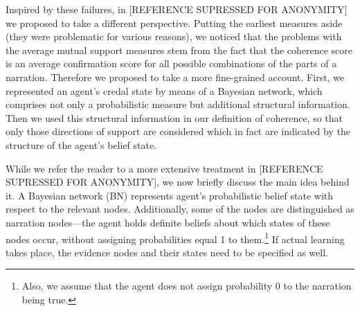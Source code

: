 \documentclass[
  10pt,
]{scrartcl}
\begin{document}
Inspired by these failures, in {[}REFERENCE SUPRESSED FOR ANONYMITY{]} we proposed to take a different perspective. Putting the earliest measures aside (they were problematic for various reasons), we noticed that the problems with the average mutual support measures stem from the fact that the coherence score is an average confirmation score for all possible combinations of the parts of a narration. Therefore we proposed to take a more fine-grained account. First, we represented an agent's credal state by means of a Bayesian network, which comprises not only a probabilistic measure but additional structural information. Then we used this structural information in our definition of coherence, so that only those directions of support are considered which in fact are indicated by the structure of the agent's belief state.

While we refer the reader to a more extensive treatment in {[}REFERENCE SUPRESSED FOR ANONYMITY{]}, we now briefly discuss the main idea behind it. A Bayesian network (BN) represents agent's probabilistic belief state with respect to the relevant nodes. Additionally, some of the nodes are distinguished as narration nodes---the agent holds definite beliefs about which states of these nodes occur, without assigning probabilities equal 1 to them.\footnote{Also, we assume that the agent does not assign probability 0 to the narration being true.} If actual learning takes place, the evidence nodes and their states need to be specified as well.
\end{document}
